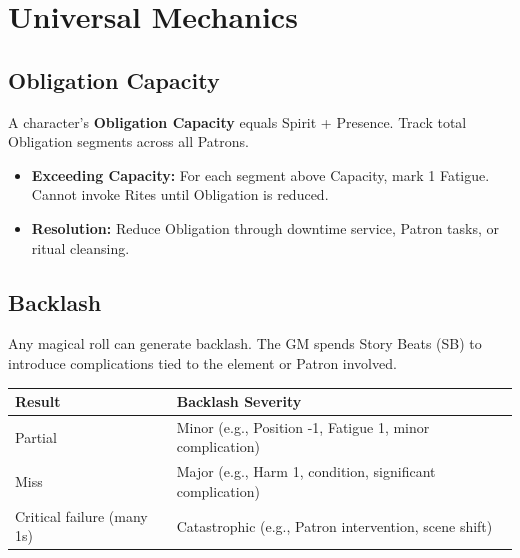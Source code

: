 \section{Universal Mechanics}
\label{sec:universal-magic-mechanics}

\subsection{Obligation Capacity}
\label{sec:obligation-capacity}

A character’s \textbf{Obligation Capacity} equals Spirit + Presence.  
Track total Obligation segments across all Patrons.

\begin{itemize}
  \item \textbf{Exceeding Capacity:} For each segment above Capacity, mark 1 Fatigue. Cannot invoke Rites until Obligation is reduced.
  \item \textbf{Resolution:} Reduce Obligation through downtime service, Patron tasks, or ritual cleansing.
\end{itemize}

\subsection{Backlash}
\label{sec:magic-backlash}

Any magical roll can generate backlash. The GM spends Story Beats (SB) to introduce complications tied to the element or Patron involved.

\begin{center}
\small
\begin{tabular}{ll}
\toprule
\textbf{Result} & \textbf{Backlash Severity} \\
\midrule
Partial & Minor (e.g., Position -1, Fatigue 1, minor complication) \\
Miss & Major (e.g., Harm 1, condition, significant complication) \\
Critical failure (many 1s) & Catastrophic (e.g., Patron intervention, scene shift) \\
\bottomrule
\end{tabular}
\end{center}

